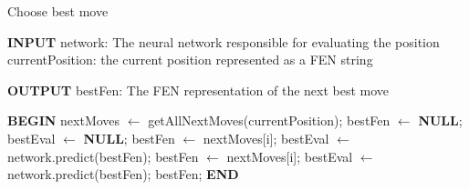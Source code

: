 \documentclass[runningheads,a4paper,11pt]{report}
\begin{document}
\begin{algorithm}
	\caption{Choose best move}
	\label{BestMove}
		\begin{algorithmic}
        
        \STATE \textbf{INPUT}
        \STATE  network: The neural network responsible for evaluating the                       position
        \STATE currentPosition: the current position represented as a FEN string
        
        \STATE \textbf{OUTPUT}
        \STATE  bestFen: The FEN representation of the next best move 
        
		\STATE \textbf{BEGIN}
  		\STATE nextMoves $\leftarrow$ getAllNextMoves(currentPosition);
  		\STATE bestFen $\leftarrow$ \textbf{NULL};
  		\STATE bestEval $\leftarrow$ \textbf{NULL};
  		        \STATE bestFen $\leftarrow$ nextMoves[i];
  		        \STATE bestEval $\leftarrow$ network.predict(bestFen);
  		        \STATE bestFen $\leftarrow$ nextMoves[i];
  		        \STATE bestEval $\leftarrow$ network.predict(bestFen);
  		    \ENDIF
  		\ENDFOR
  		\RETURN bestFen;
  		\STATE \textbf{END}
\end{algorithmic}
\end{algorithm}
\end{document}
